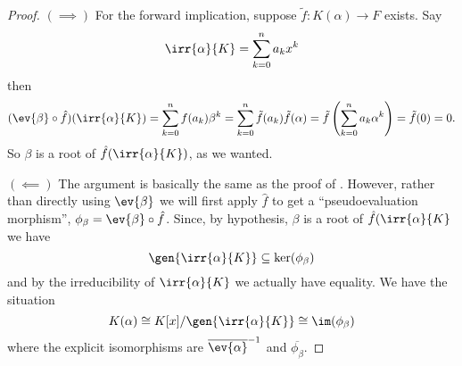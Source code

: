 \documentclass[12pt,oneside]{book}
\begin{document}
\begin{proof}
	\( (\implies) \) For the forward implication, suppose \( \tilde{f} \colon K(\alpha) \to
	F \) exists. Say
	\begin{equation*}
		\irr{\alpha}{K} = \sum_{k = 0}^{n} a_k x^k
	\end{equation*}
	then	
	\begin{equation*}
		(\ev{\beta} \circ \hat{f})(\irr{\alpha}{K})= \sum_{k = 0}^{n} f(a_k) \beta^k = \sum_{k
		= 0}^{n} \tilde{f}(a_k) \tilde{f}(\alpha) = \tilde{f} \left(\sum_{k = 0}^{n} a_k
		\alpha^k\right) = \tilde{f}(0) = 0.
	\end{equation*}
	So \( \beta \) is a root of \( \hat{f}(\irr{\alpha}{K}) \), as we wanted.

	\( (\impliedby) \) The argument is basically the same as the proof of
	. However, rather than directly using \( \ev{\beta}
	\) we will first apply \( \hat{f} \) to get a ``pseudoevaluation morphism'', \( \phi_\beta =
	\ev{\beta} \circ \hat{f} \). Since, by hypothesis, \( \beta \) is a root of \(
	\hat{f}(\irr{\alpha}{K} \) we have
	\begin{equation*}
		\gen{\irr{\alpha}{K}} \subseteq \ker(\phi_\beta)
	\end{equation*}
	and by the irreducibility of \( \irr{\alpha}{K} \) we actually have equality. We have
	the situation
	\begin{equation*}
		K(\alpha) \cong K[x]/\gen{\irr{\alpha}{K}} \cong \im(\phi_\beta)
	\end{equation*}
	where the explicit isomorphisms are \( \overline{\ev{\alpha}}^{-1} \) and \(
	\overline{\phi_\beta} \). 


\end{proof}
\end{document}
